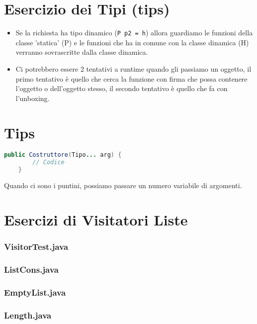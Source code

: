 \documentclass[10pt]{article}
\begin{document}
\section{Esercizio dei Tipi (tips)}
\begin{itemize}
    \item Se la richiesta ha tipo dinamico (\texttt{P p2 = h}) allora guardiamo le funzioni della classe 'statica' (P) e le funzioni che ha in comune con la classe dinamica (H) verranno sovrascritte dalla classe dinamica.
    \item Ci potrebbero essere 2 tentativi a runtime quando gli passiamo un oggetto, il primo tentativo è quello che cerca la funzione con firma che possa contenere l'oggetto o dell'oggetto stesso, il secondo tentativo è quello che fa con l'unboxing. 
\end{itemize}
\section{Tips}
\begin{lstlisting}[language=Java]
    public Costruttore(Tipo... arg) {
        // Codice
    }
\end{lstlisting}
Quando ci sono i puntini, possiamo passare un numero variabile di argomenti.
\section{Esercizi di Visitatori Liste}
        \subsubsection{VisitorTest.java}
            
        \subsubsection{ListCons.java}
            
        \subsubsection{EmptyList.java}
            
        \subsubsection{Length.java}
            
\end{document}
